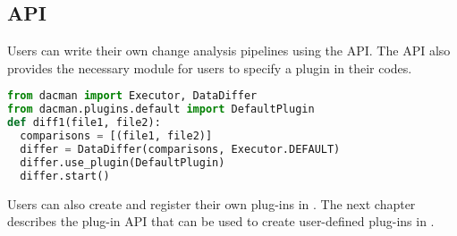\subsection{\systemname API}
Users can write their own change analysis pipelines using the
\systemname API. The API also provides the necessary module for
users to specify a plugin in their codes.

\begin{lstlisting}[language=Python]
from dacman import Executor, DataDiffer
from dacman.plugins.default import DefaultPlugin
def diff1(file1, file2):
  comparisons = [(file1, file2)]
  differ = DataDiffer(comparisons, Executor.DEFAULT)
  differ.use_plugin(DefaultPlugin)
  differ.start()
\end{lstlisting}

Users can also create and register their own plug-ins in \systemname.
The next chapter describes the \systemname plug-in API that can be used
to create user-defined plug-ins in \systemname.
